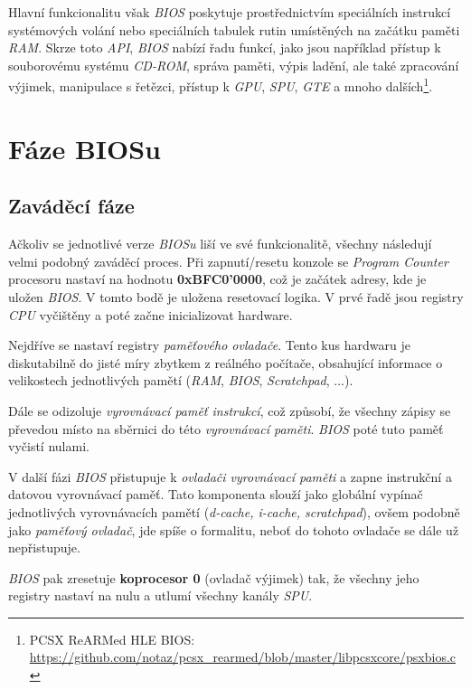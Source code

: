 Hlavní funkcionalitu však \textit{BIOS} poskytuje prostřednictvím speciálních instrukcí systémových volání nebo speciálních tabulek 
rutin umístěných na začátku paměti \textit{RAM}. Skrze toto \textit{API}, \textit{BIOS} nabízí řadu funkcí, jako jsou například 
přístup k souborovému systému \textit{CD-ROM}, správa paměti, výpis ladění, ale také zpracování výjimek, 
manipulace s řetězci, přístup k \textit{GPU}, \textit{SPU}, \textit{GTE} a mnoho dalších\footnote{PCSX ReARMed HLE BIOS: \url{https://github.com/notaz/pcsx_rearmed/blob/master/libpcsxcore/psxbios.c}}.

\section{Fáze BIOSu}

\subsection{Zaváděcí fáze}

Ačkoliv se jednotlivé verze \textit{BIOSu} liší ve své funkcionalitě, všechny následují velmi podobný
zaváděcí proces. Při zapnutí/resetu konzole se \textit{Program Counter} procesoru nastaví na hodnotu
\textbf{0xBFC0'0000}, což je začátek adresy, kde je uložen \textit{BIOS}. V tomto bodě je uložena resetovací
logika. V prvé řadě jsou registry \textit{CPU} vyčištěny a poté začne inicializovat hardware.

Nejdříve se nastaví registry \textit{paměťového ovladače}. Tento kus hardwaru je diskutabilně do jisté míry zbytkem z reálného
počítače, obsahující informace o velikostech jednotlivých pamětí (\textit{RAM}, \textit{BIOS}, \textit{Scratchpad}, ...).

Dále se odizoluje \textit{vyrovnávací paměť instrukcí}, což způsobí, že všechny zápisy se převedou místo na
sběrnici do této \textit{vyrovnávací paměti}. \textit{BIOS} poté tuto paměť vyčistí nulami.

V další fázi \textit{BIOS} přistupuje k \textit{ovladači vyrovnávací paměti} a zapne instrukční a datovou vyrovnávací paměť.
Tato komponenta slouží jako globální vypínač jednotlivých vyrovnávacích pamětí (\textit{d-cache, i-cache, scratchpad}), ovšem podobně
jako \textit{paměťový ovladač}, jde spíše o formalitu, neboť do tohoto ovladače se dále už nepřistupuje.

\textit{BIOS} pak zresetuje \textbf{koprocesor 0} (ovladač výjimek) tak, že všechny jeho registry nastaví na nulu a
utlumí všechny kanály \textit{SPU}.

